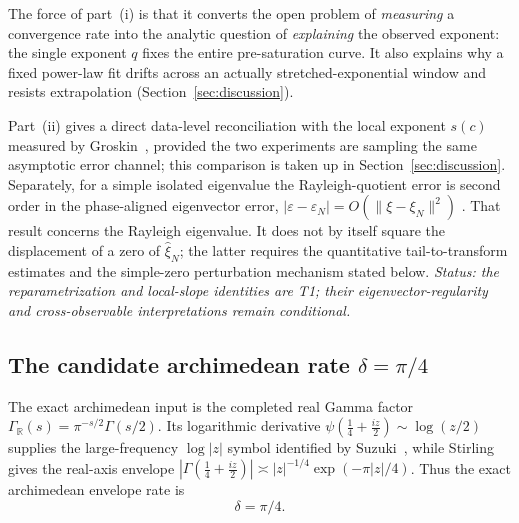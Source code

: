 \documentclass[11pt,a4paper]{article}
\begin{document}
The force of part~(i) is that it converts the open problem of \emph{measuring}
a convergence rate into the analytic question of \emph{explaining} the
observed exponent: the single exponent $q$ fixes the entire pre-saturation
curve. It also explains why a fixed power-law fit drifts across an actually
stretched-exponential window and resists extrapolation
(Section~\ref{sec:discussion}).

Part~(ii) gives a direct data-level reconciliation with the local exponent
$s(c)$ measured by Groskin~\cite{Groskin2026}, provided the two experiments are
sampling the same asymptotic error channel; this comparison is taken up in
Section~\ref{sec:discussion}. Separately, for a simple isolated eigenvalue the
Rayleigh-quotient error is second order in the phase-aligned eigenvector error,
$|\varepsilon-\varepsilon_N|=O(\|\xi-\xi_N\|^2)$
\cite{BabuskaOsborn1991,ZhuArgentatiKnyazev2013,Nakatsukasa2018,HaasNakatsukasa2025}. That result concerns the Rayleigh eigenvalue. It does
not by itself square the displacement of a zero of $\widehat\xi_N$; the latter
requires the quantitative tail-to-transform estimates and the simple-zero
perturbation mechanism stated below. \emph{Status: the reparametrization and
local-slope identities are T1; their eigenvector-regularity and cross-observable
interpretations remain conditional.}

\subsection{The candidate archimedean rate $\delta=\pi/4$}\label{ssec:arch}

The exact archimedean input is the completed real Gamma factor
$\Gamma_\mathbb{R}(s)=\pi^{-s/2}\Gamma(s/2)$. Its logarithmic derivative
$\psi(\tfrac14+\tfrac{iz}{2})\sim\log(z/2)$ supplies the large-frequency
$\log|z|$ symbol identified by Suzuki~\cite{Suzuki2026}, while Stirling gives
the real-axis envelope
$|\Gamma(\tfrac14+\tfrac{iz}{2})|\asymp
|z|^{-1/4}\exp(-\pi|z|/4)$. Thus the exact archimedean envelope rate is
\begin{equation}\label{eq:delta}
  \delta=\pi/4 .
\end{equation}
\end{document}
